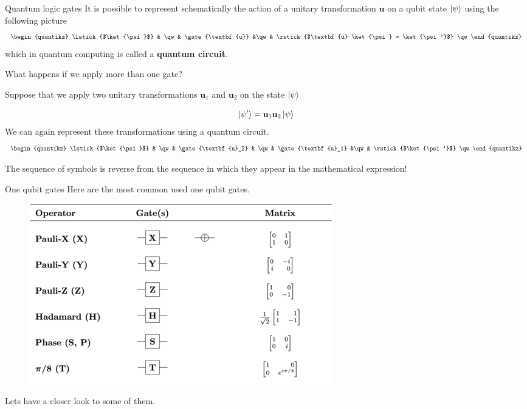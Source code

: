 \documentclass[11p,aspectratio=169]{beamer}
\begin{document}
\begin{frame}{Quantum logic gates}
    It is possible to represent schematically the action of a unitary transformation $\textbf{u}$ on a
    qubit state $\ket{\psi}$ using the following picture
    $$
    \begin{quantikz}
        \lstick{$\ket{\psi}$} & \qw & \gate{\textbf{u}} &\qw
        & \rstick{$\textbf{u} \ket{\psi} = \ket{\psi '}$} \qw
        \end{quantikz}
        $$
        which in quantum computing is called a \textbf{quantum circuit}.

    What happens if we apply more than one gate?
    
    Suppose that we apply two unitary transformations $\textbf{u}_1$ and $\textbf{u}_2$ on the state $\ket{\psi}$

    $$ \ket{\psi'} = \textbf{u}_1 \textbf{u}_2 \ket{\psi}$$
    We can again represent these transformations using a quantum circuit.
    $$
    \begin{quantikz}
        \lstick{$\ket{\psi}$} & \qw & \gate{\textbf{u}_2} & \qw &  \gate{\textbf{u}_1} &\qw
        & \rstick{$\ket{\psi '}$} \qw
        \end{quantikz}$$ 

    \begin{tcolorbox}[title=Observation]
        The sequence of symbols is reverse from the sequence in which they appear in the mathematical expression!
    \end{tcolorbox}
    
    
\end{frame}

\begin{frame}{One qubit gates}
    Here are the most common used one qubit gates.

    \begin{figure}
        \includegraphics[width=\textwidth]{figures/Quantum_Logic_Gates_1.png}
    \end{figure}
    Lets have a closer look to some of them.
\end{frame}
\end{document}
